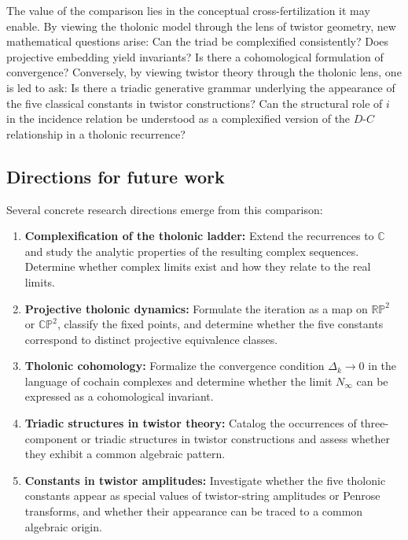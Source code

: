 \documentclass[12pt]{article}
\begin{document}
The value of the comparison lies in the conceptual cross-fertilization it may enable.
By viewing the tholonic model through the lens of twistor geometry, new mathematical
questions arise: Can the triad be complexified consistently?  Does projective embedding
yield invariants?  Is there a cohomological formulation of convergence?  Conversely, by
viewing twistor theory through the tholonic lens, one is led to ask: Is there a triadic
generative grammar underlying the appearance of the five classical constants in twistor
constructions?  Can the structural role of $i$ in the incidence relation be understood
as a complexified version of the $D$-$C$ relationship in a tholonic recurrence?

\subsection{Directions for future work}\label{sec:future}

Several concrete research directions emerge from this comparison:
\begin{enumerate}
  \item \textbf{Complexification of the tholonic ladder:} Extend the recurrences to
        $\mathbb{C}$ and study the analytic properties of the resulting complex
        sequences.  Determine whether complex limits exist and how they relate to the
        real limits.
  \item \textbf{Projective tholonic dynamics:} Formulate the iteration as a map on
        $\mathbb{RP}^2$ or $\mathbb{CP}^2$, classify the fixed points, and determine
        whether the five constants correspond to distinct projective equivalence classes.
  \item \textbf{Tholonic cohomology:} Formalize the convergence condition
        $\Delta_k \to 0$ in the language of cochain complexes and determine whether
        the limit $N_\infty$ can be expressed as a cohomological invariant.
  \item \textbf{Triadic structures in twistor theory:} Catalog the occurrences of
        three-component or triadic structures in twistor constructions and assess whether
        they exhibit a common algebraic pattern.
  \item \textbf{Constants in twistor amplitudes:} Investigate whether the five tholonic
        constants appear as special values of twistor-string amplitudes or Penrose
        transforms, and whether their appearance can be traced to a common algebraic
        origin.
\end{enumerate}
\end{document}
